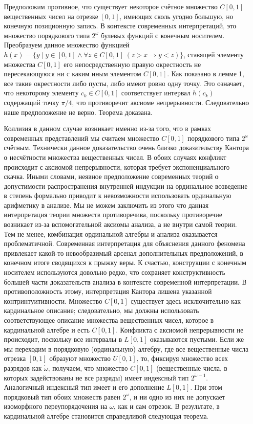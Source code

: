\documentclass[12pt]{article}
\begin{document}
Предположим противное, что существует некоторое счётное множество $C[0, 1]$ вещественных чисел на отрезке $[0, 1]$, имеющих сколь угодно большую, но конечную позиционную запись. В контексте современных интерпретаций, это множество порядкового типа $2^{\omega}$ булевых функций с конечным носителем. Преобразуем данное множество функцией $h(x) = \{ y \mid y \in [0, 1] \wedge \forall z \in C[0, 1] \; (z > x \Rightarrow y < z) \}$, ставящей элементу множества $C[0, 1]$ его непосредственную правую окрестность не пересекающуюся ни с каким иным элементом $C[0, 1]$. Как показано в лемме 1, все такие окрестности либо пусты, либо имеют ровно одну точку. Это означает, что некоторому элементу $c_k \in C[0, 1]$ соответствует интервал $h(c_k)$ содержащий точку $\pi/4$, что противоречит аксиоме непрерывности. Следовательно наше предположение не верно. Теорема доказана. 

Коллизия в данном случае возникает именно из-за того, что в рамках современных представлений мы считаем множество $C[0, 1]$ порядкового типа $2^{\omega}$ счётным. Технически данное доказательство очень близко доказательству Кантора о несчётности множества вещественных чисел. В обоих случаях конфликт происходит с аксиомой непрерывности, которая требует экспоненциального скачка. Иными словами, неявное предположение современных теорий о допустимости распространения внутренней индукции на ординальное возведение в степень формально приводит к невозможности использовать ординальную арифметику в анализе. Мы не можем заключить из этого что данная интерпретация теории множеств противоречива, поскольку противоречие возникает из-за вспомогательной аксиомы анализа, а не внутри самой теории. Тем не менее, комбинация ординальной алгебры и анализа оказывается проблематичной. Современная интерпретация для объяснения данного феномена привлекает какой-то невообразимый арсенал дополнительных предположений, в конечном итоге сводящихся к прыжку веры. К счастью, конструкции с конечным носителем используются довольно редко, что сохраняет конструктивность большей части доказательств анализа в контексте современной интерпретации. В противоположность этому, интерпретация Кантора лишена указанной контринтуитивности. Множество $C[0, 1]$ существует здесь исключительно как кардинальное описание; следовательно, мы должны использовать соответствующее описание множества вещественных чисел, которое в кардинальной алгебре и есть $C[0, 1]$. Конфликта с аксиомой непрерывности не происходит, поскольку все интервалы в $L[0, 1]$ оказываются пустыми. Если же мы переходим в порядковую (ординальную) алгебру, где все вещественные числа отрезка $[0, 1]$ образуют множество $U[0,1]$, то, фиксируя множество всех разрядов как $\dot{\omega}$, получаем, что множество $C[0, 1]$ (вещественные числа, в которых задействованы не все разряды) имеет индексный тип $2^{\dot{\omega} - 1}$. Аналогичный индексный тип имеет и его дополнение $L[0, 1]$. При этом порядковый тип обоих множеств равен $2^{\omega}$, и ни одно из них не допускает изоморфного переупорядочения на $\omega$, как и сам отрезок. В результате, в кардинальной алгебре становится справедливой следующая теорема.
\end{document}
